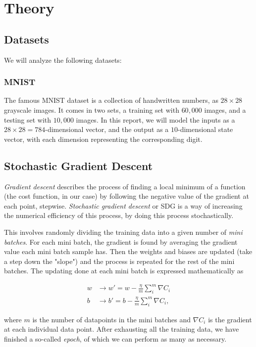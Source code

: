 \documentclass[../main.tex]{subfiles}
\begin{document}
\section{Theory}
\subsection{Datasets}
We will analyze the following datasets:
\subsubsection{MNIST}
The famous MNIST dataset is a collection of handwritten numbers, as $28\times 28$ grayscale images. It comes in two sets, a training set with $60,000$ images, and a testing set with $10,000$ images. In this report, we will model the inputs as a $28\times 28 = 784$-dimensional vector, and the output as a $10$-dimensional state vector, with each dimension representing the corresponding digit.

\subsection{Stochastic Gradient Descent}
\textit{Gradient descent} describes the process of finding a local minimum of a function (the cost function, in our case) by following the negative value of the gradient at each point, stepwise. \textit{Stochastic gradient descent} or SDG is a way of increasing the numerical efficiency of this process, by doing this process stochastically.

This involves randomly dividing the training data into a given number of \textit{mini batches}. For each mini batch, the gradient is found by averaging the gradient value each mini batch sample has. Then the weights and biases are updated (take a step down the "slope") and the process is repeated for the rest of the mini batches. The updating done at each mini batch is expressed mathematically as

\begin{align*}
    w&\rightarrow w' = w - \frac{\eta}{m}\sum_i^m \nabla C_i \\
    b&\rightarrow b' = b - \frac{\eta}{m}\sum_i^m \nabla C_i,
\end{align*}

where $m$ is the number of datapoints in the mini batches and $\nabla C_i$ is the gradient at each individual data point. After exhausting all the training data, we have finished a so-called \textit{epoch}, of which we can perform as many as necessary.
\end{document}
